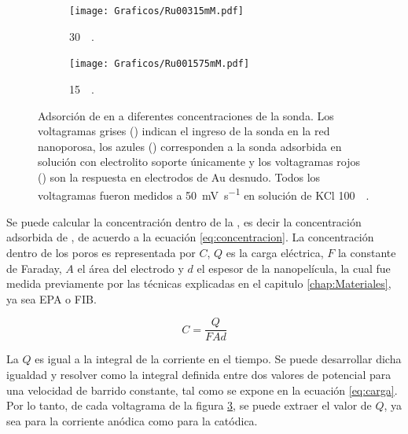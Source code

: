 \begin{figure}[th]
\begin{subfigure}[t]{0.325\textwidth}
			        	\texttt{[image: Graficos/Ru00315mM.pdf]}
			       		\vspace*{-0.40cm}\caption{\aminorutenio\space \SI{30}{\micro\Molar}.}
			         	\label{fig:Ru00315mM}
			     		\end{subfigure}
		     		\begin{subfigure}[t]{0.325\textwidth}
			        	\texttt{[image: Graficos/Ru001575mM.pdf]}
			       		\vspace*{-0.40cm}\caption{\aminorutenio\space \SI{15}{\micro\Molar}.}
			         	\label{fig:Ru001575mM}
			     		\end{subfigure}	
		 	   	   	\caption[Preconcentración de \aminorutenio\space en \pdmF]{Adsorción de \ru\space en \pdm\space a diferentes concentraciones de la sonda. Los voltagramas grises (\usebox{\gris}) indican el ingreso de la sonda en la red nanoporosa, los azules (\usebox{\azul}) corresponden a la sonda adsorbida en solución con electrolito soporte únicamente y los voltagramas rojos (\usebox{\rojo}) son la respuesta en electrodos de Au desnudo. Todos los voltagramas fueron medidos a \SI{50}{\milli\volt\per\second} en solución de KCl \SI{100}{\milli\Molar}.}
		     		\label{fig:preconcentraciones}
		     	   	\end{figure} 	

		Se puede calcular la concentración dentro de la \pdm, es decir la concentración adsorbida de \ru, de acuerdo a la ecuación \ref{eq:concentracion}. La concentración dentro de los poros es representada por $C$, $Q$ es la carga eléctrica, $F$ la constante de Faraday, $A$ el área del electrodo y $d$ el espesor de la nanopelícula, la cual fue medida previamente por las técnicas explicadas en el capitulo \ref{chap:Materiales}, ya sea EPA o FIB.

			\begin{equation}
					C=\frac{Q}{FAd}
					\label{eq:concentracion}
			\end{equation}

		La $Q$ es igual a la integral de la corriente en el tiempo. Se puede desarrollar dicha igualdad y resolver como la integral definida entre dos valores de potencial para una velocidad de barrido constante, tal como se expone en la ecuación \ref{eq:carga}. Por lo tanto, de cada voltagrama de la figura \ref{fig:preconcentraciones}, se puede extraer el valor de $Q$, ya sea para la corriente anódica como para la catódica.
		
